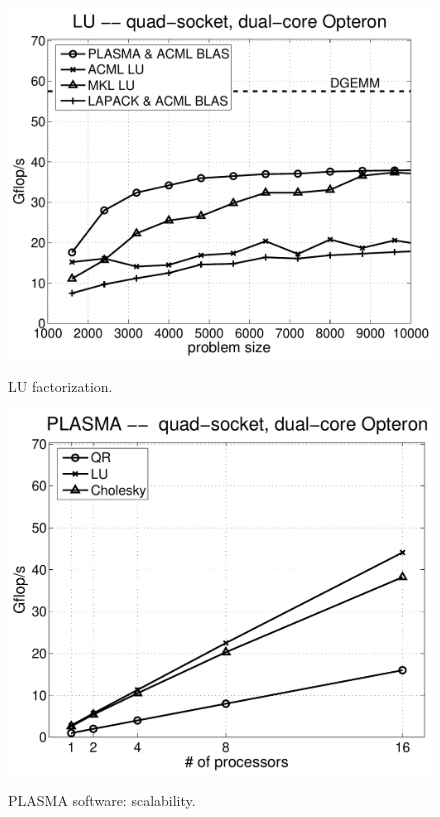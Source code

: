 \documentclass{article}
\begin{document}
\begin{figure}
\begin{minipage}[tl]{0.5\textwidth}
\begin{center}
{\includegraphics[width=1\textwidth]{images/sb_lu}}
\caption{\label{fig:lu} LU factorization.}
\end{center}
\end{minipage}
\hspace{0.25cm}
\begin{minipage}[tr]{0.5\textwidth}
\begin{center}
{\includegraphics[width=1\textwidth]{images/sb_scal}}
\caption{\label{fig:scal} PLASMA software: scalability.}
\end{center}
\end{minipage}
\end{figure}
\end{document}
